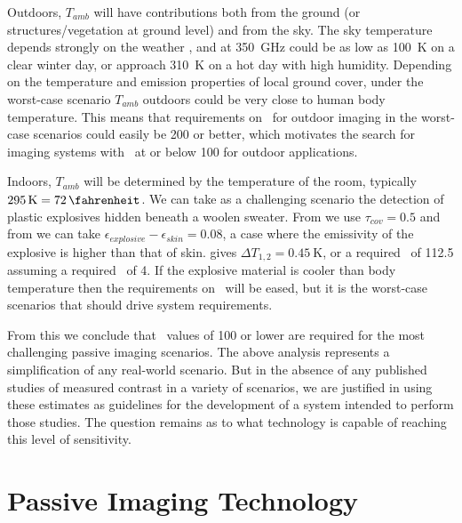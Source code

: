 Outdoors, $T_{amb}$ will have contributions both from the ground (or structures/vegetation at ground level) and from the sky.
The sky temperature depends strongly on the weather \cite{appleby_standoff_2007}, and at \SI{350}{\GHz} could be as low as \SI{100}{\K} on a clear winter day, or approach \SI{310}{\K} on a hot day with high humidity.
Depending on the temperature and emission properties of local ground cover, under the worst-case scenario $T_{amb}$ outdoors could be very close to human body temperature.
This means that requirements on \NETD\ for outdoor imaging in the worst-case scenarios could easily be \SI{200}{\mK} or better, which motivates the search for imaging systems with \NETD\ at or below \SI{100}{\mK} for outdoor applications. 

Indoors, $T_{amb}$ will be determined by the temperature of the room, typically $\SI{295}{\K} = \SI{72}{\fahrenheit}$.
We can take as a challenging scenario the detection of plastic explosives hidden beneath a woolen sweater.
From \cite{bjarnason_millimeter-wave_2004} we use $\tau_{cov} = 0.5$ and from \cite{appleby_standoff_2007} we can take $\epsilon_{explosive} - \epsilon_{skin} = 0.08$, a case where the emissivity of the explosive is higher than that of skin.
 gives $\Delta T_{1,2} = \SI{0.45}{\K}$, or a required \NETD\ of \SI{112.5}{\mK} assuming a required \SN\ of 4.
If the explosive material is cooler than body temperature then the requirements on \NETD\ will be eased, but it is the worst-case scenarios that should drive system requirements.

From this we conclude that \NETD\ values of \SI{100}{\mK} or lower are required for the most challenging passive imaging scenarios.
The above analysis represents a simplification of any real-world scenario.
But in the absence of any published studies of measured contrast in a variety of scenarios, we are justified in using these estimates as guidelines for the development of a system intended to perform those studies.
The question remains as to what technology is capable of reaching this level of sensitivity.

\section{Passive Imaging Technology} \label{sec:ch1-passive-tech}

